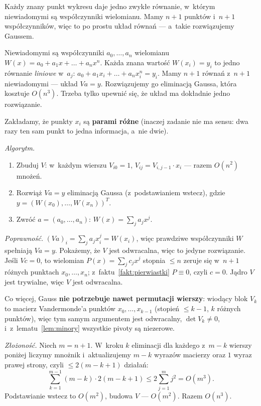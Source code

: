 \documentclass[11pt]{article}
\begin{document}
\begin{poludzku}
Każdy znany punkt wykresu daje jedno zwykłe równanie, w~którym
niewiadomymi są współczynniki wielomianu. Mamy $n+1$ punktów
i~$n+1$ współczynników, więc to po prostu układ równań --- a~takie
rozwiązujemy Gaussem.
\end{poludzku}

\begin{intuicja}
Niewiadomymi są współczynniki $a_0,\ldots,a_n$ wielomianu
$W(x)=a_0+a_1x+\dots+a_nx^n$. Każda znana wartość $W(x_i)=y_i$ to
jedno równanie \emph{liniowe} w~$a_j$:
$a_0+a_1x_i+\dots+a_nx_i^n=y_i$. Mamy $n+1$ równań z~$n+1$ niewiadomymi
--- układ $Va=y$. Rozwiązujemy go eliminacją Gaussa, która kosztuje
$O(n^3)$. Trzeba tylko upewnić się, że układ ma dokładnie jedno rozwiązanie.
\end{intuicja}

\formalnie
Zakładamy, że punkty $x_i$ są \textbf{parami różne} (inaczej zadanie nie
ma sensu: dwa razy ten sam punkt to jedna informacja, a~nie dwie).

\emph{Algorytm.}
\begin{enumerate}
\item Zbuduj $V$: w~każdym wierszu $V_{i0}=1$, $V_{ij}=V_{i,j-1}\cdot x_i$
--- razem $O(n^2)$ mnożeń.
\item Rozwiąż $Va=y$ eliminacją Gaussa (z~podstawianiem wstecz),
gdzie $y=(W(x_0),\ldots,W(x_n))^T$.
\item Zwróć $a=(a_0,\ldots,a_n)$: $W(x)=\sum_j a_jx^j$.
\end{enumerate}

\emph{Poprawność.} $(Va)_i=\sum_ja_jx_i^j=W(x_i)$, więc prawdziwe
współczynniki $W$ spełniają $Va=y$. Pokażemy, że $V$ jest odwracalna,
więc to jedyne rozwiązanie. Jeśli $Vc=0$, to wielomian
$P(x)=\sum_jc_jx^j$ stopnia $\le n$ zeruje się w~$n+1$ różnych punktach
$x_0,\ldots,x_n$; z~faktu~\ref{fakt:pierwiastki} $P\equiv0$, czyli $c=0$.
Jądro $V$ jest trywialne, więc $V$ jest odwracalna.

Co więcej, Gauss \textbf{nie potrzebuje nawet permutacji wierszy}: wiodący
blok $V_k$ to macierz Vandermonde'a punktów $x_0,\ldots,x_{k-1}$ (stopień
$\le k-1$, $k$ różnych punktów), więc tym samym argumentem jest odwracalny,
$\det V_k\ne0$, i~z~lematu~\ref{lem:minory} wszystkie pivoty są niezerowe.

\emph{Złożoność.} Niech $m=n+1$. W~kroku $k$ eliminacji dla każdego
z~$m-k$ wierszy poniżej liczymy mnożnik i~aktualizujemy $m-k$ wyrazów
macierzy oraz $1$ wyraz prawej strony, czyli $\le2(m-k+1)$ działań:
\[
\sum_{k=1}^{m-1}(m-k)\cdot2(m-k+1)\le2\sum_{j=1}^{m}j^2=O(m^3).
\]
Podstawianie wstecz to $O(m^2)$, budowa $V$ --- $O(m^2)$. Razem $O(n^3)$.
\end{document}
